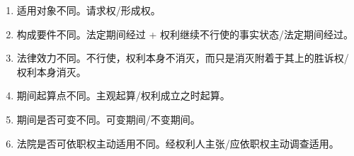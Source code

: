 \begin{enumerate}
\begin{enumerate}
          \item 适用对象不同。请求权/形成权。
          \item 构成要件不同。法定期间经过 + 权利继续不行使的事实状态/法定期间经过。
          \item 法律效力不同。不行使，权利本身不消灭，而只是消灭附着于其上的胜诉权/权利本身消灭。
          \item 期间起算点不同。主观起算/权利成立之时起算。
          \item 期间是否可变不同。可变期间/不变期间。
          \item 法院是否可依职权主动适用不同。经权利人主张/应依职权主动调查适用。
        \end{enumerate}
\end{enumerate}
